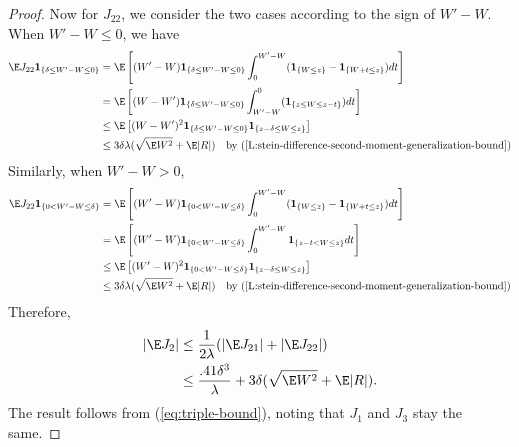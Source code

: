 \begin{proof}
  Now for $J_{22}$, we consider the two cases according to the sign of $W'-W$.  When $W' - W \leq 0$, we have
  \begin{align*}
    \E J_{22}\mathbf{1}_{\{ \delta \leq W'-W \leq 0 \}} &= \E \left [
      (W'-W) \mathbf{1}_{\{ \delta \leq W'-W \leq 0 \}} \int_0^{W'-W}(\mathbf{1}_{\{W \leq z\}} -
      \mathbf{1}_{\{W + t \leq z\}}) dt \right ] \\
    &= \E \left [
      (W-W') \mathbf{1}_{\{ \delta \leq W'-W \leq 0 \}} \int_{W'-W}^0 (\mathbf{1}_{\{z \leq W \leq z - t\}})
      dt \right ] \\
    &\leq \E \left [
      (W-W')^2 \mathbf{1}_{\{ \delta \leq W'-W \leq 0 \}} \mathbf{1}_{\{ z - \delta \leq W \leq z \}} \right ] \\
    &\leq 3 \delta \lambda (\sqrt{\E W^2} + \E |R|) \quad \text{by (\ref{L:stein-difference-second-moment-generalization-bound})}
  \end{align*}
  Similarly, when $W' - W > 0$,
  \begin{align*}
    \E J_{22}\mathbf{1}_{\{ 0 < W'-W \leq \delta \}} &= \E \left [
      (W'-W) \mathbf{1}_{\{ 0 < W'-W \leq \delta \}} \int_0^{W'-W}(\mathbf{1}_{\{W \leq z\}} -
      \mathbf{1}_{\{W + t \leq z\}}) dt \right ] \\
    &= \E \left [
      (W'-W) \mathbf{1}_{\{ 0 < W'-W \leq \delta \}} \int_0^{W'-W} \mathbf{1}_{\{ z - t < W \leq z\}} dt \right ] \\
    &\leq \E \left [
      (W'-W)^2 \mathbf{1}_{\{ 0 < W'-W \leq \delta \}} \mathbf{1}_{\{ z - \delta \leq W \leq z \}} \right ] \\
    &\leq 3 \delta \lambda (\sqrt{\E W^2} + \E |R|) \quad \text{by (\ref{L:stein-difference-second-moment-generalization-bound})}
  \end{align*}
  Therefore,
  \begin{align*}
    |\E J_{2}| &\leq \frac{1}{2\lambda}(|\E J_{21}| + |\E J_{22}|) \\
    &\leq \frac{.41\delta^3}{\lambda} + 3\delta (\sqrt{\E W^2} + \E |R|).
  \end{align*}
  The result follows from (\ref{eq:triple-bound}), noting that $J_1$ and $J_3$ stay the same.
\end{proof}
